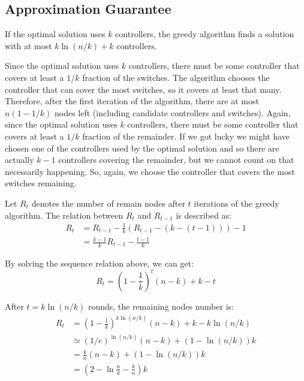 



\subsection{Approximation Guarantee}
If the optimal solution uses $k$ controllers, the greedy algorithm finds a solution with at most $k\ln(n/k)+k$ controllers.

Since the optimal solution uses $k$ controllers, there must be some controller that covers at least a $1/k$ fraction of the switches. The algorithm chooses the controller that can cover the most switches, so it covers at least that many. Therefore, after the first iteration of the algorithm, there are at most $n(1-1/k)$ nodes left (including candidate controllers and switches). Again, since the optimal solution uses $k$ controllers, there must be some controller that covers at least a $1/k$ fraction of the remainder. If we got lucky we might have chosen one of the controllers used by the optimal solution and so there are actually $k-1$ controllers covering the remainder, but we cannot count on that necessarily happening. So, again, we choose the controller that covers the most switches remaining. 

Let $R_t$ denotes the number of remain nodes after $t$ iterations of the greedy algorithm. The relation between $R_t$ and $R_{t-1}$ is described as:
\begin{equation}
\begin{aligned}
R_t & = R_{t-1}-\frac{1}{k}(R_{t-1}-(k-(t-1)))-1 \\
& = \frac{k-1}{k}R_{t-1} - \frac{t-1}{k}
\end{aligned}
\end{equation}

By solving the sequence relation above, we can get:
\begin{equation}
R_t = (1-\frac{1}{k})^t(n-k)+k-t
\end{equation}

After $t=k\ln(n/k)$ rounds, the remaining nodes number is:
\begin{equation}
\label{rt}
\begin{aligned}
R_t & = (1-\frac{1}{k})^{k\ln(n/k)}(n-k)+k-k\ln(n/k) \\
& \simeq (1/e)^{\ln(n/k)}(n-k)+(1-\ln(n/k))k \\
& = \frac{k}{n}(n-k)+(1-\ln(n/k))k \\
& = (2-\ln \frac{n}{k}- \frac{k}{n})k \\
\end{aligned}
\end{equation}

